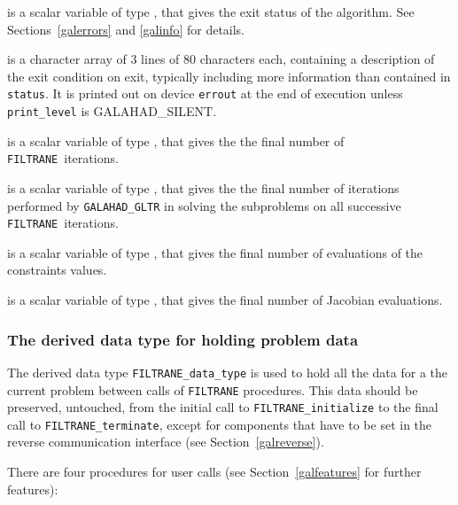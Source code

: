 \documentclass{galahad}
\newcommand{\packagename}{FILTRANE}
\newcommand{\sym}{\sf\small}
\newcommand{\filtrane}{{\tt \packagename}}
\begin{document}
\begin{description}

 is a scalar variable of type \integer, that gives the
exit status of the algorithm. See Sections~\ref{galerrors} and \ref{galinfo}
for details.

 is a character array of 3 lines of 80 characters each, 
containing a description of the exit condition
on exit, typically including more information
than contained in {\tt status}.
It is printed out on device {\tt errout} at the end of execution
unless {\tt print\_level} is {\sym GALAHAD\_SILENT}.

 is a scalar variable of type \integer, that
gives the the final number of \filtrane\ iterations.

 is a scalar variable of type \integer, that
gives the the final number of iterations performed by {\tt GALAHAD\_GLTR} in
solving the subproblems on all successive \filtrane\ iterations.

 is a scalar variable of type \integer, that
gives the final number of evaluations of the constraints values.

 is a scalar variable of type \integer, that
gives the final number of Jacobian evaluations.
\end{description}


\subsubsection{The derived data type for holding problem data}\label{typedata}
The derived data type 
{\tt \packagename\_data\_type} 
is used to hold all the data for a the current problem between calls of 
{\tt \packagename} procedures. 
This data should be preserved, untouched, from the initial call to 
{\tt \packagename\_initialize}
to the final call to
{\tt \packagename\_terminate}, except for components that have to be set in
the reverse communication interface (see Section~\ref{galreverse}).


\galarguments
There are four procedures for user calls
(see Section~\ref{galfeatures} for further features): 
\end{document}
